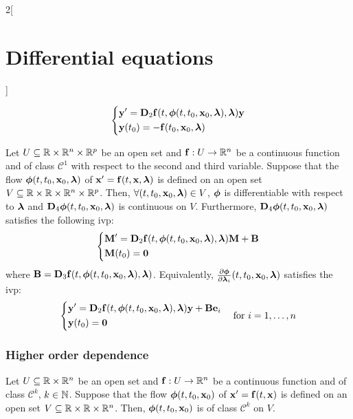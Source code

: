 \documentclass[../../../main.tex]{subfiles}
\begin{document}
\begin{multicols}{2}[\section{Differential equations}]
\begin{theorem}[Dependence on $t_0$]
    \begin{equation*}
      \left\{
      \begin{aligned}
         & \vf{y}'      =\vf{D}_2\vf{f}(t,\vf{\phi}(t,t_0,\vf{x}_0,\vf{\lambda}),\vf{\lambda})\vf{y} \\
         & \vf{y}(t_0)  = -\vf{f}(t_0,\vf{x}_0,\vf{\lambda})
      \end{aligned}
      \right.
    \end{equation*}
  \end{theorem}
  \begin{theorem}
    Let $U\subseteq\RR\times\RR^n\times\RR^p$ be an open set and $\vf{f}:U\rightarrow\RR^n$ be a continuous function and of class $\mathcal{C}^1$ with respect to the second and third variable. Suppose that the flow $\vf{\phi}(t,t_0,\vf{x}_0,\vf{\lambda})$ of $\vf{x}'=\vf{f}(t,\vf{x},\vf{\lambda})$ is defined on an open set $V\subseteq\RR\times\RR\times\RR^n\times\RR^p$. Then, $\forall (t,t_0,\vf{x}_0,\vf{\lambda})\in V$, $\vf{\phi}$ is differentiable with respect to $\vf{\lambda}$ and $\vf{D}_4\vf{\phi}(t,t_0,\vf{x}_0,\vf{\lambda})$ is continuous on $V$. Furthermore, $\vf{D}_4\vf{\phi}(t,t_0,\vf{x}_0,\vf{\lambda})$ satisfies the following ivp:
    \begin{equation*}
      \left\{
      \begin{aligned}
         & \vf{M}'      =\vf{D}_2\vf{f}(t,\vf{\phi}(t,t_0,\vf{x}_0,\vf{\lambda}),\vf{\lambda})\vf{M}+ \vf{B} \\
         & \vf{M}(t_0)  =\vf{0}
      \end{aligned}
      \right.
    \end{equation*}
    where $\vf{B}=\vf{D}_3\vf{f}(t,\vf{\phi}(t,t_0,\vf{x}_0,\vf{\lambda}),\vf{\lambda})$. Equivalently, $\frac{\partial\vf{\phi}}{\partial \vf{\lambda}_i}(t,t_0,\vf{x}_0,\vf{\lambda})$ satisfies the ivp:
    $$
      \left\{
      \begin{aligned}
         & \vf{y}'      =\vf{D}_2\vf{f}(t,\vf{\phi}(t,t_0,\vf{x}_0,\vf{\lambda}),\vf{\lambda})\vf{y}+\vf{B}\vf{e}_i \\
         & \vf{y}(t_0)  =\vf{0}
      \end{aligned}
      \right.\quad\text{for }i=1,\ldots,n
    $$
  \end{theorem}
  \subsubsection{Higher order dependence}
  \begin{theorem}
    Let $U\subseteq\RR\times\RR^n$ be an open set and $\vf{f}:U\rightarrow\RR^n$ be a continuous function and of class $\mathcal{C}^k$, $k\in\NN$. Suppose that the flow $\vf{\phi}(t,t_0,\vf{x}_0)$ of $\vf{x}'=\vf{f}(t,\vf{x})$ is defined on an open set $V\subseteq\RR\times\RR\times\RR^n$. Then, $\vf{\phi}(t,t_0,\vf{x}_0)$ is of class $\mathcal{C}^k$ on $V$.
  \end{theorem}

\end{multicols}
\end{document}
